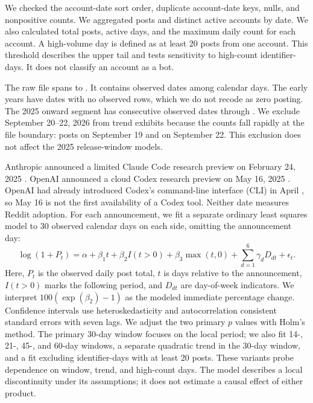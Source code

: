 \documentclass[11pt]{article}
\begin{document}
We checked the account-date sort order, duplicate account-date keys, nulls, and nonpositive counts. We aggregated posts and distinct active accounts by date. We also calculated total posts, active days, and the maximum daily count for each account. A high-volume day is defined as at least 20 posts from one account. This threshold describes the upper tail and tests sensitivity to high-count identifier-days. It does not classify an account as a bot.

The raw file spans \dataFirstDate{} to \dataLastRawDate{}. It contains \dataObservedDates{} observed dates among \dataCalendarDays{} calendar days. The early years have dates with no observed rows, which we do not recode as zero posting. The 2025 onward segment has \dataRecentDates{} consecutive observed dates through \dataAnalysisEnd{}. We exclude September 20--22, 2026 from trend exhibits because the counts fall rapidly at the file boundary: \dataLastStablePosts{} posts on September 19 and \dataLastDayPosts{} on September 22. This exclusion does not affect the 2025 release-window models.

Anthropic announced a limited Claude Code research preview on February 24, 2025 \cite{anthropic2025}. OpenAI announced a cloud Codex research preview on May 16, 2025 \cite{openai2025}. OpenAI had already introduced Codex's command-line interface (CLI) in April \cite{openaiCli2025}, so May 16 is not the first availability of a Codex tool. Neither date measures Reddit adoption. For each announcement, we fit a separate ordinary least squares model to 30 observed calendar days on each side, omitting the announcement day:
\[
\log(1+P_t)=\alpha+\beta_1 t+\beta_2 I(t>0)+\beta_3\max(t,0)+\sum_{d=1}^{6}\gamma_d D_{dt}+\epsilon_t.
\]
Here, $P_t$ is the observed daily post total, $t$ is days relative to the announcement, $I(t>0)$ marks the following period, and $D_{dt}$ are day-of-week indicators. We interpret $100(\exp(\beta_2)-1)$ as the modeled immediate percentage change. Confidence intervals use heteroskedasticity and autocorrelation consistent standard errors with seven lags. We adjust the two primary $p$ values with Holm's method. The primary 30-day window focuses on the local period; we also fit 14-, 21-, 45-, and 60-day windows, a separate quadratic trend in the 30-day window, and a fit excluding identifier-days with at least 20 posts. These variants probe dependence on window, trend, and high-count days. The model describes a local discontinuity under its assumptions; it does not estimate a causal effect of either product.
\end{document}
